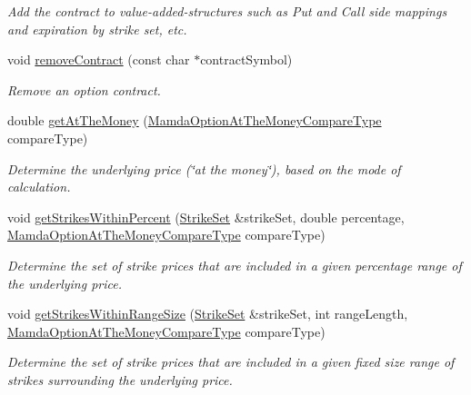 \begin{CompactItemize}
\begin{CompactList}\small\item\em Add the contract to value-added-structures such as Put and Call side mappings and expiration by strike set, etc. \item\end{CompactList}\item 
void \hyperlink{classWombat_1_1MamdaOptionChain_0eed67c8d6b07d556716d25eb5c66e2a}{remove\-Contract} (const char $\ast$contract\-Symbol)
\begin{CompactList}\small\item\em Remove an option contract. \item\end{CompactList}\item 
double \hyperlink{classWombat_1_1MamdaOptionChain_57a5adfcdfe5568e51707d9a84051eaa}{get\-At\-The\-Money} (\hyperlink{namespaceWombat_a07b06a78fb02e1f93ee37a2d944c33a}{Mamda\-Option\-At\-The\-Money\-Compare\-Type} compare\-Type)
\begin{CompactList}\small\item\em Determine the underlying price (\char`\"{}at the money\char`\"{}), based on the mode of calculation. \item\end{CompactList}\item 
void \hyperlink{classWombat_1_1MamdaOptionChain_d009476aa7401aaf6cb09ddaa782f262}{get\-Strikes\-Within\-Percent} (\hyperlink{namespaceWombat_302d481a195bac5c9315c82cdbc79447}{Strike\-Set} \&strike\-Set, double percentage, \hyperlink{namespaceWombat_a07b06a78fb02e1f93ee37a2d944c33a}{Mamda\-Option\-At\-The\-Money\-Compare\-Type} compare\-Type)
\begin{CompactList}\small\item\em Determine the set of strike prices that are included in a given percentage range of the underlying price. \item\end{CompactList}\item 
void \hyperlink{classWombat_1_1MamdaOptionChain_e49d773a9a0767a928ef2f55b4bd6d10}{get\-Strikes\-Within\-Range\-Size} (\hyperlink{namespaceWombat_302d481a195bac5c9315c82cdbc79447}{Strike\-Set} \&strike\-Set, int range\-Length, \hyperlink{namespaceWombat_a07b06a78fb02e1f93ee37a2d944c33a}{Mamda\-Option\-At\-The\-Money\-Compare\-Type} compare\-Type)
\begin{CompactList}\small\item\em Determine the set of strike prices that are included in a given fixed size range of strikes surrounding the underlying price. \item\end{CompactList}\item 

\end{CompactItemize}
